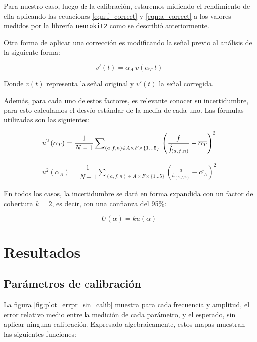 \documentclass[conference]{IEEEtran}
\begin{document}
Para nuestro caso, luego de la calibración, estaremos midiendo el rendimiento
de ella aplicando las ecuaciones \ref{eqn:f_correct} y \ref{eqn:a_correct} a 
los valores medidos por la librería \texttt{neurokit2} como se describió
anteriormente.

Otra forma de aplicar una corrección es modificando la señal previo al análisis
de la siguiente forma:

$$ v'(t) = \alpha_{A} ~ v(\alpha_T ~ t)$$

Donde $v(t)$ representa la señal original y $v'(t)$ la señal corregida.

Además, para cada uno de estos factores, es relevante conocer su incertidumbre,
para esto calculamos el desvío estándar de la media de cada uno. Las fórmulas
utilizadas son las siguientes:

\begin{equation}
u^2 \left( \alpha_{T} \right) = \dfrac{1}{N - 1} \sum_{(a,f,n) \in A \times F
\times \{1...5 \}}\nolimits \\\left( \frac{f}{\hat{f}_{(a,f,n)}} - 
\overline{\alpha_{T}} \right)^2
\label{eqn:alpha_f_u}
\end{equation}


\begin{equation}
\begin{split}
u^2 \left( \alpha_{A} \right) = \dfrac{1}{N - 1} \sum_{(a,f,n) \in A \times F
\times \{1...5 \}}\nolimits \left( \frac{a}{\hat{a}_{(a,f,n)}} -
\overline{\alpha_{A}} \right)^2 
\label{eqn:alpha_a_u}
\end{split}
\end{equation}

En todos los casos, la incertidumbre se dará en forma expandida con un factor de
cobertura $k = 2$, es decir, con una confianza del 95\%:

$$U(\alpha) = k u(\alpha)$$

\section{Resultados}


\subsection{Parámetros de calibración}


La figura \ref{fig:plot_errpr_sin_calib} muestra para cada frecuencia y
amplitud, el error relativo medio entre la medición de cada parámetro, y el
esperado, sin aplicar ninguna calibración.
Expresado algebraicamente, estos mapas muestran las siguientes funciones:
\end{document}
